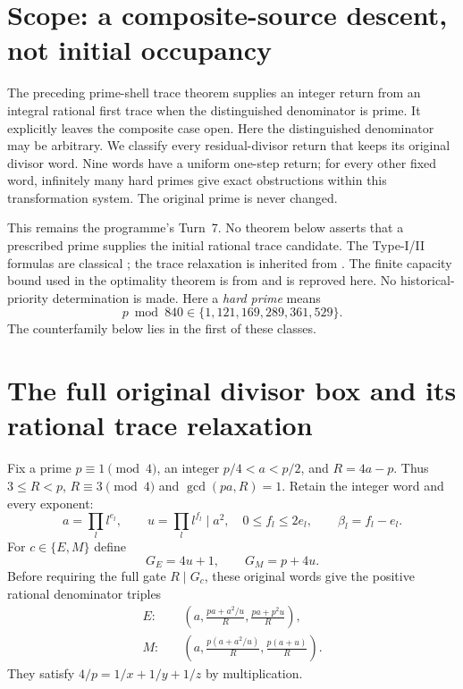 \section{Scope: a composite-source descent, not initial occupancy}
The preceding prime-shell trace theorem \cite{PrimeTrace} supplies an integer
return from an integral rational first trace when the distinguished denominator
is prime. It explicitly leaves the composite case open. Here the distinguished
denominator may be arbitrary. We classify every residual-divisor return that
keeps its original divisor word. Nine words have a uniform one-step return;
for every other fixed word, infinitely many hard primes give exact obstructions
within this transformation system. The original prime is never changed.

This remains the programme's Turn~7. No theorem below asserts that a prescribed
prime supplies the initial rational trace candidate. The Type-I/II formulas are
classical \cite[\S2, Propositions 2.2 and 2.6]{ET}; the trace relaxation is
inherited from \cite[TR17--19]{Trace}. The finite capacity bound used in the
optimality theorem is from \cite[Theorem ``Sharp finite-repair bound'']{Capacity}
and is reproved here. No historical-priority determination is made.
Here a \emph{hard prime} means
\[
 p\bmod840\in\{1,121,169,289,361,529\}.
\]
The counterfamily below lies in the first of these classes.

\section{The full original divisor box and its rational trace relaxation}
Fix a prime $p\equiv1\pmod4$, an integer $p/4<a<p/2$, and
$R=4a-p$. Thus $3\le R<p$, $R\equiv3\pmod4$ and $\gcd(pa,R)=1$.
Retain the integer word and every exponent:
\[
 a=\prod_l l^{e_l},\qquad u=\prod_l l^{f_l}\mid a^2,
 \quad 0\le f_l\le2e_l,\qquad \beta_l=f_l-e_l.
\]
For $c\in\{E,M\}$ define
\[
 G_E=4u+1,\qquad G_M=p+4u.
\]
Before requiring the full gate $R\mid G_c$, these original words give the
positive rational denominator triples
\begin{align}
 E:&\quad \left(a,\frac{pa+a^2/u}{R},\frac{pa+p^2u}{R}\right),\label{eq:Erational}\\
 M:&\quad \left(a,\frac{p(a+a^2/u)}{R},\frac{p(a+u)}{R}\right).\label{eq:Mrational}
\end{align}
They satisfy $4/p=1/x+1/y+1/z$ by multiplication.

